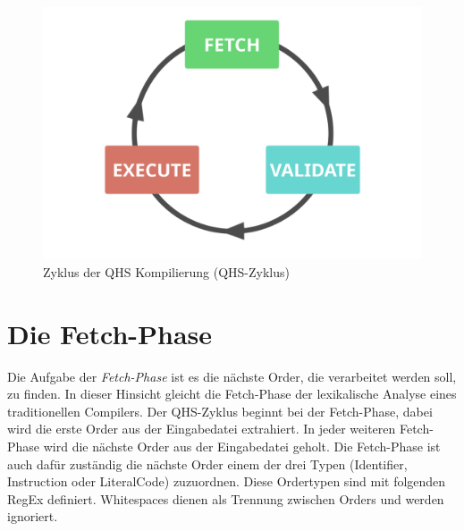 \begin{figure}[h!]
    \centering
    \includegraphics[scale=0.6]{resources/images/qhs-cycle.png}
    \caption{Zyklus der QHS Kompilierung (QHS-Zyklus)}
    \label{fig:qhs-cycle}
\end{figure}

\section{Die Fetch-Phase} \label{sec:qhs-fetch}
Die Aufgabe der \textit{Fetch-Phase} ist es die nächste Order, die verarbeitet werden soll, zu finden. In dieser Hinsicht gleicht die Fetch-Phase der lexikalische Analyse eines traditionellen Compilers.
Der QHS-Zyklus beginnt bei der Fetch-Phase, dabei wird die erste Order aus der Eingabedatei extrahiert. In jeder weiteren Fetch-Phase wird die nächste Order aus der Eingabedatei geholt.
Die Fetch-Phase ist auch dafür zuständig die nächste Order einem der drei Typen (Identifier, Instruction oder LiteralCode) zuzuordnen.
Diese Ordertypen sind mit folgenden RegEx definiert. Whitespaces dienen als Trennung zwischen Orders und werden ignoriert.

